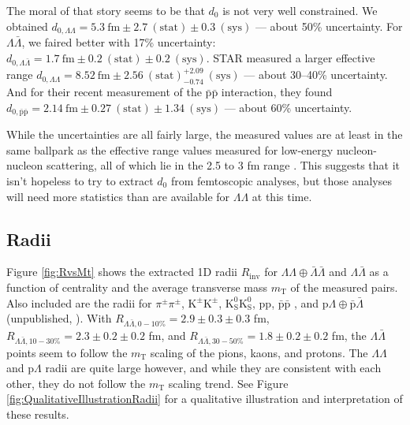 The moral of that story seems to be that $d_0$ is not very well constrained. 
We obtained $d_{0,\Lambda\Lambda} =  5.3\ \mathrm{fm} \pm 2.7\ \mathrm{(stat)} \pm 0.3\ \mathrm{(sys)}$ --- about 50\% uncertainty.
For $\Lambda\bar{\Lambda}$, we faired better with 17\% uncertainty: $d_{0,\Lambda\bar{\Lambda}} =  1.7\ \mathrm{fm} \pm 0.2\ \mathrm{(stat)} \pm 0.2\ \mathrm{(sys)}$.
STAR measured a larger effective range $d_{0,\Lambda\Lambda} =  8.52\ \mathrm{fm} \pm 2.56\ \mathrm{(stat)}^{+2.09}_{-0.74}\ \mathrm{(sys)}$ --- about 30--40\% uncertainty.
And for their recent measurement of the $\mathrm{\bar{p}\bar{p}}$ interaction, they found $d_{0,\bar{\mathrm{p}}\bar{\mathrm{p}}} = 2.14\ \mathrm{fm} \pm 0.27\ \mathrm{(stat)} \pm 1.34\ \mathrm{(sys)}$ --- about 60\% uncertainty. 

While the uncertainties are all fairly large, the measured values are at least in the same ballpark as the effective range values measured for low-energy nucleon-nucleon scattering, all of which lie in the 2.5 to 3 fm range \cite{Noyes:1973zd}.
This suggests that it isn't hopeless to try to extract $d_0$ from femtoscopic analyses, but those analyses will need more statistics than are available for $\Lambda\Lambda$ at this time.

\subsection{Radii}

Figure \ref{fig:RvsMt} shows the extracted 1D radii $R_{\mathrm{inv}}$ for $\Lambda\Lambda\oplus\bar{\Lambda}\bar{\Lambda}$ and $\Lambda\bar{\Lambda}$ as a function of centrality and the average transverse mass $m_{\mathrm{T}}$ of the measured pairs.
Also included are the radii for $\pi^\pm\pi^\pm$, $\mathrm{K^\pm}\mathrm{K^\pm}$, $\mathrm{K^0_S}\mathrm{K^0_S}$, pp, $\bar{\mathrm{p}}\bar{\mathrm{p}}$ \cite{Adam:2015vja}, and p$\Lambda\oplus\bar{\mathrm{p}}\bar{\Lambda}$ (unpublished, \cite{Beck:2015msi}).
With $R_{\Lambda\bar{\Lambda},0-10\%} = 2.9\pm 0.3 \pm 0.3$ fm, $R_{\Lambda\bar{\Lambda},10-30\%} = 2.3\pm 0.2 \pm 0.2$ fm, and $R_{\Lambda\bar{\Lambda},30-50\%} = 1.8\pm 0.2 \pm 0.2$ fm, the $\Lambda\bar{\Lambda}$ points seem to follow the $m_\mathrm{T}$ scaling of the pions, kaons, and protons.
The $\Lambda\Lambda$ and p$\Lambda$ radii are quite large however, and while they are consistent with each other, they do not follow the $m_\mathrm{T}$ scaling trend.
See Figure \ref{fig:QualitativeIllustrationRadii} for a qualitative illustration and interpretation of these results.


